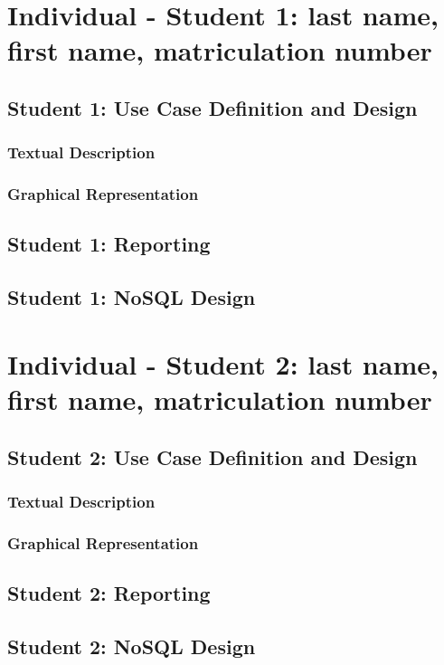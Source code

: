\documentclass[a4paper, 11pt]{article}          %
\newcommand{\studentone}{Student 1: last name, first name, matriculation number}
\newcommand{\studenttwo}{Student 2: last name, first name, matriculation number}
\begin{document}
\newpage

\section*{Individual - \studentone}
\subsection{Student 1: Use Case Definition and Design}
\subsubsection{Textual Description}                             
\subsubsection{Graphical Representation}
\subsection{Student 1: Reporting}
\subsection{Student 1: NoSQL Design}

\newpage

\section*{Individual - \studenttwo}
\subsection{Student 2: Use Case Definition and Design}
\subsubsection{Textual Description}                             
\subsubsection{Graphical Representation}
\subsection{Student 2: Reporting}
\subsection{Student 2: NoSQL Design}

\end{document}
